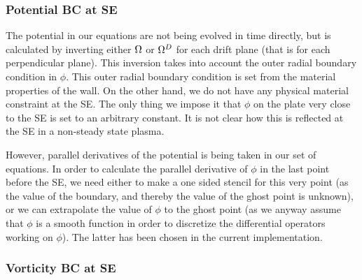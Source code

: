 \subsubsection{Potential BC at SE}
%
The potential in our equations are not being evolved in time directly, but is calculated by inverting either $\Omega$ or $\Omega^D$ for each drift plane (that is for each perpendicular plane).
This inversion takes into account the outer radial boundary condition in $\phi$.
This outer radial boundary condition is set from the material properties of the wall.
On the other hand, we do not have any physical material constraint at the SE.
The only thing we impose it that $\phi$ on the plate very close to the SE is set to an arbitrary constant.
 It is not clear how this is reflected at the SE in a non-steady state plasma.

However, parallel derivatives of the potential is being taken in our set of equations.
In order to calculate the parallel derivative of $\phi$ in the last point before the SE, we need either to make a one sided stencil for this very point (as the value of the boundary, and thereby the value of the ghost point is unknown), or we can extrapolate the value of $\phi$ to the ghost point (as we anyway assume that $\phi$ is a smooth function in order to discretize the differential operators working on $\phi$).
The latter has been chosen in the current implementation.

\subsubsection{Vorticity BC at SE}
%
%

